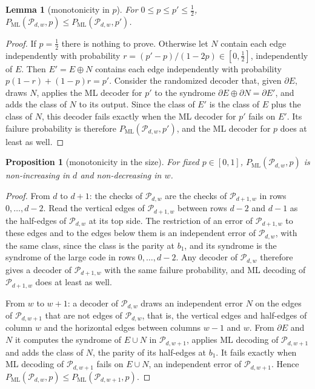 \documentclass[11pt]{amsart}
\newtheorem{lemma}[theorem]{Lemma}
\newtheorem{proposition}[theorem]{Proposition}
\theoremstyle{definition}
\theoremstyle{remark}
\numberwithin{equation}{section}
\newcommand{\PML}{P_{\mathrm{ML}}}
\begin{document}
\begin{lemma}[monotonicity in $p$]\label{lem:monoq}
For $0\le p\le p'\le\tfrac12$, $\PML(\mathcal P_{d,w},p)\le\PML(\mathcal P_{d,w},p')$.
\end{lemma}

\begin{proof}
If $p=\tfrac12$ there is nothing to prove. Otherwise let $N$ contain each edge independently with probability $r=(p'-p)/(1-2p)\in[0,\tfrac12]$, independently of $E$. Then $E'=E\oplus N$ contains each edge independently with probability $p(1-r)+(1-p)r=p'$. Consider the randomized decoder that, given $\partial E$, draws $N$, applies the ML decoder for $p'$ to the syndrome $\partial E\oplus\partial N=\partial E'$, and adds the class of $N$ to its output. Since the class of $E'$ is the class of $E$ plus the class of $N$, this decoder fails exactly when the ML decoder for $p'$ fails on $E'$. Its failure probability is therefore $\PML(\mathcal P_{d,w},p')$, and the ML decoder for $p$ does at least as well.
\end{proof}

\begin{proposition}[monotonicity in the size]\label{prop:monosize}
For fixed $p\in[0,1]$, $\PML(\mathcal P_{d,w},p)$ is non-increasing in $d$ and non-decreasing in $w$.
\end{proposition}

\begin{proof}
From $d$ to $d+1$: the checks of $\mathcal P_{d,w}$ are the checks of $\mathcal P_{d+1,w}$ in rows $0,\dots,d-2$. Read the vertical edges of $\mathcal P_{d+1,w}$ between rows $d-2$ and $d-1$ as the half-edges of $\mathcal P_{d,w}$ at its top side. The restriction of an error of $\mathcal P_{d+1,w}$ to these edges and to the edges below them is an independent error of $\mathcal P_{d,w}$, with the same class, since the class is the parity at $b_1$, and its syndrome is the syndrome of the large code in rows $0,\dots,d-2$. Any decoder of $\mathcal P_{d,w}$ therefore gives a decoder of $\mathcal P_{d+1,w}$ with the same failure probability, and ML decoding of $\mathcal P_{d+1,w}$ does at least as well.

From $w$ to $w+1$: a decoder of $\mathcal P_{d,w}$ draws an independent error $N$ on the edges of $\mathcal P_{d,w+1}$ that are not edges of $\mathcal P_{d,w}$, that is, the vertical edges and half-edges of column $w$ and the horizontal edges between columns $w-1$ and $w$. From $\partial E$ and $N$ it computes the syndrome of $E\cup N$ in $\mathcal P_{d,w+1}$, applies ML decoding of $\mathcal P_{d,w+1}$ and adds the class of $N$, the parity of its half-edges at $b_1$. It fails exactly when ML decoding of $\mathcal P_{d,w+1}$ fails on $E\cup N$, an independent error of $\mathcal P_{d,w+1}$. Hence $\PML(\mathcal P_{d,w},p)\le\PML(\mathcal P_{d,w+1},p)$.
\end{proof}
\end{document}
